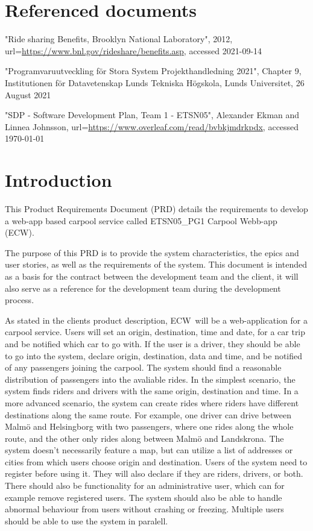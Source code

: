 \documentclass{article}
\newcommand{\name}{ECW\ }
\newcommand{\nameNospace}{ECW}
\begin{document}
\newpage

\section{Referenced documents}
\begin{thebibliography}{widest entry}
     "Ride sharing Benefits, Brooklyn National Laboratory", 2012, url=\url{https://www.bnl.gov/rideshare/benefits.asp}, accessed 2021-09-14
    
     "Programvaruutveckling för Stora System Projekthandledning 2021", Chapter 9, Institutionen för Datavetenskap Lunds Tekniska Högskola, Lunds Universitet, 26 August 2021
    
     "SDP - Software Development Plan, Team 1 - ETSN05", Alexander Ekman and Linnea Johnsson, url=\url{https://www.overleaf.com/read/bvbkjmdrkpdx}, accessed \today
    
\end{thebibliography}

\section{Introduction}\label{sec:intro}
This Product Requirements Document (PRD) details the requirements to develop a web-app based carpool service called ETSN05\_PG1 Carpool Webb-app (\nameNospace).

The purpose of this PRD is to provide the system characteristics, the epics and user stories, as well as the requirements of the system. This document is intended as a basis for the contract between the development team and the client, it will also serve as a reference for the development team during the development process.

As stated in the clients product description\cite{PH}, \name will be a web-application for a carpool service. Users will set an origin, destination, time and date, for a car trip and be notified which car to go with. If the user is a driver, they should be able to go into the system, declare origin, destination, data and time, and be notified of any passengers joining the carpool. The system should find a reasonable distribution of passengers into the avaliable rides. In the simplest scenario, the system finds riders and drivers with the same origin, destination and time. In a more advanced scenario, the system can create rides where riders have different destinations along the same route. For example, one driver can drive between Malmö and Helsingborg with two passengers, where one rides along the whole route, and the other only rides along between Malmö and Landskrona. The system doesn't necessarily feature a map, but can utilize a list of addresses or cities from which users choose origin and destination. Users of the system need to register before using it. They will also declare if they are riders, drivers, or both. There should also be functionality for an administrative user, which can for example remove registered users. The system should also be able to handle abnormal behaviour from users without crashing or freezing. Multiple users should be able to use the system in paralell.
\end{document}
